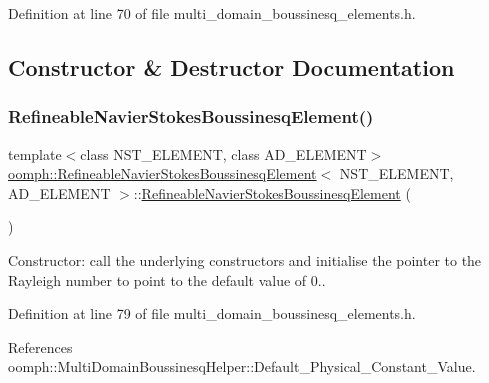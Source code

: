 Definition at line 70 of file multi\+\_\+domain\+\_\+boussinesq\+\_\+elements.\+h.



\subsection{Constructor \& Destructor Documentation}
\mbox{\label{classoomph_1_1RefineableNavierStokesBoussinesqElement_af9fd72e50fb7d6aaf43bd982ce3de295}} 
\subsubsection{\texorpdfstring{Refineable\+Navier\+Stokes\+Boussinesq\+Element()}{RefineableNavierStokesBoussinesqElement()}}
{\footnotesize\ttfamily template$<$class N\+S\+T\+\_\+\+E\+L\+E\+M\+E\+NT, class A\+D\+\_\+\+E\+L\+E\+M\+E\+NT$>$ \\
\hyperlink{classoomph_1_1RefineableNavierStokesBoussinesqElement}{oomph\+::\+Refineable\+Navier\+Stokes\+Boussinesq\+Element}$<$ N\+S\+T\+\_\+\+E\+L\+E\+M\+E\+NT, A\+D\+\_\+\+E\+L\+E\+M\+E\+NT $>$\+::\hyperlink{classoomph_1_1RefineableNavierStokesBoussinesqElement}{Refineable\+Navier\+Stokes\+Boussinesq\+Element} (\begin{DoxyParamCaption}{ }\end{DoxyParamCaption})\hspace{0.3cm}{\ttfamily [inline]}}



Constructor\+: call the underlying constructors and initialise the pointer to the Rayleigh number to point to the default value of 0.. 



Definition at line 79 of file multi\+\_\+domain\+\_\+boussinesq\+\_\+elements.\+h.



References oomph\+::\+Multi\+Domain\+Boussinesq\+Helper\+::\+Default\+\_\+\+Physical\+\_\+\+Constant\+\_\+\+Value.



